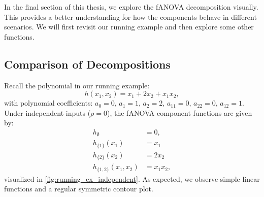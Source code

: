 In the final section of this thesis, we explore the fANOVA decomposition visually. This provides a better understanding for how the components behave in different scenarios. We will first revisit our running example and then explore some other functions.
\subsection{Comparison of Decompositions}
Recall the polynomial in our running example:
\[
h(x_1, x_2) = x_1 + 2 x_2 + x_1 x_2,
\]
with polynomial coefficients: $a_0 = 0$, $a_1 = 1$, $a_2 = 2$, $a_{11} = 0$, $a_{22} = 0$, $a_{12} = 1$.
Under independent inputs ($\rho = 0$), the fANOVA component functions are given by:
\begin{align*}
h_{\emptyset} &= 0, \\
h_{\{1\}}(x_1) &= x_1\\
h_{\{2\}}(x_2) &= 2x_2\\
h_{\{1,2\}}(x_1, x_2) &= x_1x_2,
\end{align*}
visualized in \autoref{fig:running_ex_independent}. As expected, we observe simple linear functions and a regular symmetric contour plot.
